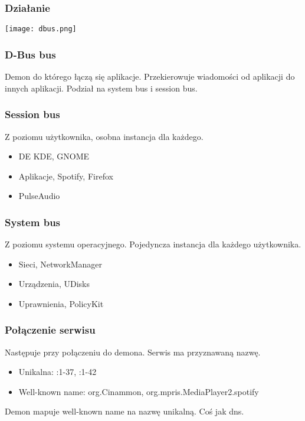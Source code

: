 \begin{frame}
    \frametitle{Działanie}
    \texttt{[image: dbus.png]}
\end{frame}



\begin{frame}
    \frametitle{D-Bus bus}
    Demon do którego łączą się aplikacje. Przekierowuje
    wiadomości od aplikacji do innych aplikacji. Podział na 
    system bus i session bus.
\end{frame}


\begin{frame}
    \frametitle{Session bus}
    Z poziomu użytkownika, osobna instancja dla każdego.
    \begin{itemize}
        \item DE KDE, GNOME 
        \item Aplikacje, Spotify, Firefox
        \item PulseAudio
    \end{itemize}
\end{frame}

\begin{frame}
    \frametitle{System bus}
    Z poziomu systemu operacyjnego. Pojedyncza instancja
    dla każdego użytkownika.
    \begin{itemize}
        \item Sieci, NetworkManager
        \item Urządzenia, UDisks
        \item Uprawnienia, PolicyKit
    \end{itemize}
\end{frame}

\begin{frame}
    \frametitle{Połączenie serwisu}
    Następuje przy połączeniu do demona.
    Serwis ma przyznawaną nazwę.
    \begin{itemize}
        \item Unikalna: :1-37, :1-42
        \item Well-known name: org.Cinammon, org.mpris.MediaPlayer2.spotify
    \end{itemize}
    Demon mapuje well-known name na nazwę unikalną.\linebreak
    Coś jak dns.
\end{frame}


